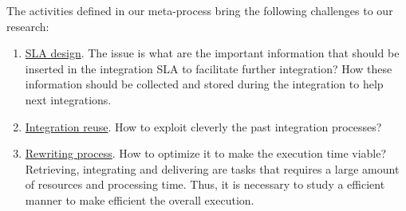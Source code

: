 The activities defined in our meta-process bring the following challenges to our research:
\begin{enumerate}
\item \underline{SLA design}. The issue is what are the important information that should be inserted in the integration SLA to facilitate further integration? How these information should be collected and stored during the integration to help next integrations.
\item \underline{Integration reuse}. How  to exploit cleverly the past integration processes? %
\item \underline{Rewriting process}. How to optimize it to make the execution time viable? Retrieving, integrating and delivering are tasks that requires a large amount of resources and processing time. Thus, it is necessary to study a efficient manner to make efficient the overall execution.%
\end{enumerate}

